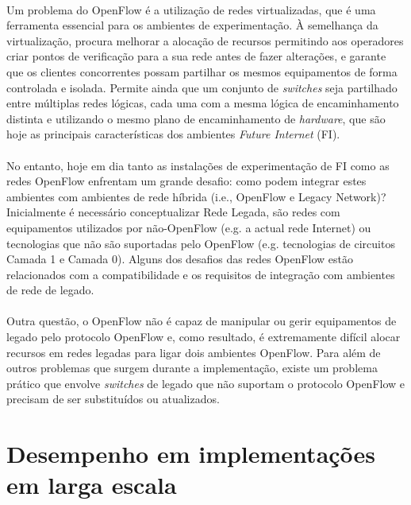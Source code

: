 \documentclass{llncs}
\begin{document}
\paragraph{}
Um problema do OpenFlow é a utilização de redes virtualizadas, que é uma ferramenta essencial para os ambientes de experimentação.
À semelhança da virtualização, procura melhorar a alocação de recursos permitindo aos operadores criar pontos de verificação para a sua rede antes de fazer alterações, e garante que os clientes concorrentes possam partilhar os mesmos equipamentos de forma controlada e isolada. 
Permite ainda que um conjunto de \textit{switches} seja partilhado entre múltiplas redes lógicas, cada uma com a mesma lógica de encaminhamento distinta e utilizando o mesmo plano de encaminhamento de \textit{hardware}, que são hoje as principais características dos ambientes \textit{Future Internet} (FI).
\paragraph{}
No entanto, hoje em dia tanto as instalações de experimentação de FI como as redes OpenFlow enfrentam um grande desafio: como podem integrar estes ambientes com ambientes de rede híbrida (i.e., OpenFlow e Legacy Network)? 
Inicialmente é necessário conceptualizar Rede Legada, são redes com equipamentos utilizados por não-OpenFlow (e.g. a actual rede Internet) ou tecnologias que não são suportadas pelo OpenFlow (e.g. tecnologias de circuitos Camada 1 e Camada 0). 
Alguns dos desafios das redes OpenFlow estão relacionados com a compatibilidade e os requisitos de integração com ambientes de rede de legado.
\paragraph{}
Outra questão, o OpenFlow não é capaz de manipular ou gerir equipamentos de legado pelo protocolo OpenFlow e, como resultado, é extremamente difícil alocar recursos em redes legadas para ligar dois ambientes OpenFlow. 
Para além de outros problemas que surgem durante a implementação, existe um problema prático que envolve \textit{switches} de legado que não suportam o protocolo OpenFlow e precisam de ser substituídos ou atualizados.

\section{Desempenho em implementações em larga escala}
\end{document}
